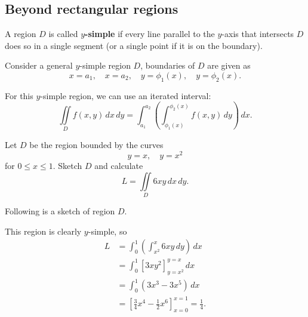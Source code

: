 \subsection{Beyond rectangular regions}

\begin{definition}
    A region $D$ is called \textbf{$y$-simple} if every line parallel to the $y$-axis that intersects $D$ does so in a single segment (or a single point if it is on the boundary).
\end{definition}

Consider a general $y$-simple region $D$, boundaries of $D$ are given as \[ x = a_1, \quad x = a_2, \quad y = \phi_1(x), \quad y = \phi_2(x). \]

For this $y$-simple region, we can use an iterated interval: \[ \iint\limits_{D} f(x, y) \, dx \, dy = \int_{a_1}^{a_2} \left( \int_{\phi_1(x)}^{\phi_2(x)} f(x, y) \, dy \right) \, dx. \]

\begin{example}
    Let $D$ be the region bounded by the curves \[ y = x, \quad y = x^2 \] for $0 \leq x \leq 1$. Sketch $D$ and calculate \[ L = \iint\limits_{D} 6 x y \, dx \, dy. \]
    
    Following is a sketch of region $D$.
    \begin{center}
    \end{center}
    This region is clearly $y$-simple, so
    \begin{align*}
        L &= \int_{0}^{1} \left( \int_{x^2}^{x} 6x y \, dy \right) \, dx \\
        &= \int_{0}^{1} \left[ 3 x y^2 \right]^{y = x}_{y = x^2} \, dx \\
        &= \int_{0}^{1} \left( 3x^3 - 3x^5 \right) \, dx \\
        &= \left[ \frac{3}{4} x^4 - \frac{1}{2} x^6 \right]^{x = 1}_{x = 0} = \frac{1}{4}.
    \end{align*}
\end{example}

